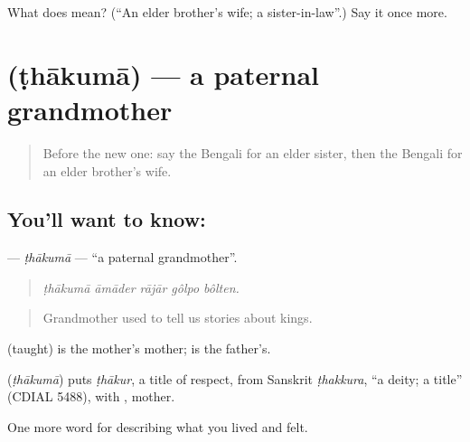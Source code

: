 \begin{tcolorbox}[breakable,colback=teal!4,colframe=teal!35!black,title={Before you move on}]
What does  mean? (\textquotedblleft{}An elder brother's wife; a sister-in-law\textquotedblright{}.) Say it once more.
\end{tcolorbox}
\section[\texorpdfstring{\bn{ঠাকুমা} (ṭhākumā)}{ঠাকুমা (ṭhākumā)}]{ (ṭhākumā) — a paternal grandmother}

\label{lesson:BN-C481-thakuma}



\begin{quote}
Before the new one: say the Bengali for an elder sister, then the Bengali for an elder brother's wife.
\end{quote}

\subsection*{You'll want to know: }
\textbf{} — \emph{ṭhākumā} — \textquotedblleft{}a paternal grandmother\textquotedblright{}.

\begin{quote}
    
\end{quote}

\begin{quote}
\emph{ṭhākumā āmāder rājār gôlpo bôlten.}
\end{quote}

\begin{quote}
Grandmother used to tell us stories about kings.
\end{quote}

 (taught) is the mother's mother;  is the father's.

\begin{cousinweb}
\textbf{} (\emph{ṭhākumā}) puts \emph{ṭhākur}, a title of respect, from Sanskrit \emph{ṭhakkura}, \textquotedblleft{}a deity; a title\textquotedblright{} (CDIAL 5488), with , mother.
\end{cousinweb}

\begin{grammarlens}[title={What you've built}]
One more word for describing what you lived and felt.
\end{grammarlens}

